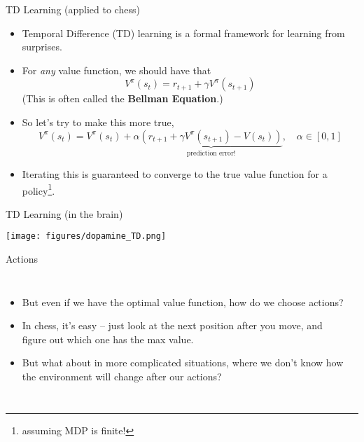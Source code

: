 \documentclass{beamer}
\begin{document}
\begin{frame}{TD Learning (applied to chess)}
\begin{itemize}
    \item<1-> Temporal Difference (TD) learning is a formal framework for learning from surprises. 
    \item<2-> For \emph{any} value function, we should have that
        \[V^{\pi}(s_{t}) = r_{t+1} + \gamma V^{\pi}(s_{t+1})\] 
        (This is often called the \textbf{Bellman Equation}.)
    \item<3-> So let's try to make this more true, 
        \[V^{\pi}(s_t) = V^{\pi}(s_t) + \alpha \underbrace{\left( r_{t+1} + \gamma V^{\pi}(s_{t+1}) - V(s_t)\right)}_{\text{prediction error!}}, \quad \alpha \in [0, 1]\]
    \item<4-> Iterating this is guaranteed to converge to the true value function for a policy\footnote{assuming MDP is finite!}.\vspace{3em}
\end{itemize}
\end{frame}

\begin{frame}{TD Learning (in the brain)}

\begin{center}
\texttt{[image: figures/dopamine\_TD.png]}
\end{center}
\end{frame}

\begin{frame}{Actions}
\begin{columns}
\begin{itemize}
    \item<1-> But even if we have the optimal value function, how do we choose actions? 
    \item<2-> In chess, it's easy -- just look at the next position after you move, and figure out which one has the max value.
    \item<3-> But what about in more complicated situations, where we don't know how the environment will change after our actions?
\end{itemize}
    \begin{center}
    \end{center}
\end{columns}
\end{frame}
\end{document}
